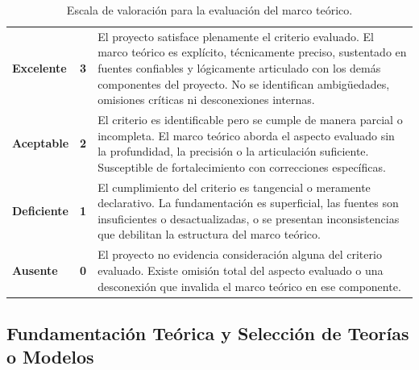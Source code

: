 \begin{table}[htbp]
\centering
\scriptsize
\caption{Escala de valoración para la evaluación del marco teórico.}
\label{tab:escala-marco-teorico}
\begin{tabularx}{\textwidth}{|C{2.8cm}|C{1cm}|X|}
\hline
{}
 &  &  \\ \hline
\textcolor{csuf}{\textbf{Excelente}} & \textbf{3} & El proyecto satisface plenamente el criterio evaluado. El marco teórico es explícito, técnicamente preciso, sustentado en fuentes confiables y lógicamente articulado con los demás componentes del proyecto. No se identifican ambigüedades, omisiones críticas ni desconexiones internas. \\ \hline
{}
\textcolor{cace}{\textbf{Aceptable}} & \textbf{2} & El criterio es identificable pero se cumple de manera parcial o incompleta. El marco teórico aborda el aspecto evaluado sin la profundidad, la precisión o la articulación suficiente. Susceptible de fortalecimiento con correcciones específicas. \\ \hline
\textcolor{cdef}{\textbf{Deficiente}} & \textbf{1} & El cumplimiento del criterio es tangencial o meramente declarativo. La fundamentación es superficial, las fuentes son insuficientes o desactualizadas, o se presentan inconsistencias que debilitan la estructura del marco teórico. \\ \hline
{}
\textcolor{cins}{\textbf{Ausente}} & \textbf{0} & El proyecto no evidencia consideración alguna del criterio evaluado. Existe omisión total del aspecto evaluado o una desconexión que invalida el marco teórico en ese componente. \\ \hline
\end{tabularx}
\end{table}

\clearpage
\subsection{Fundamentación Teórica y Selección de Teorías o Modelos}

